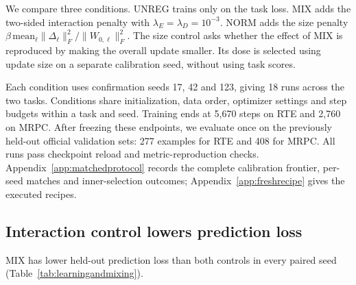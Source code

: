 \documentclass{article}
\begin{document}
We compare three conditions. UNREG trains only on the task loss. MIX adds the two-sided interaction penalty with $\lambda_E=\lambda_D=10^{-3}$. NORM adds the size penalty $\beta\,\mathrm{mean}_\ell\|\Delta_\ell\|_F^2/\|W_{0,\ell}\|_F^2$. The size control asks whether the effect of MIX is reproduced by making the overall update smaller. Its dose is selected using update size on a separate calibration seed, without using task scores.

Each condition uses confirmation seeds 17, 42 and 123, giving 18 runs across the two tasks. Conditions share initialization, data order, optimizer settings and step budgets within a task and seed. Training ends at 5{,}670 steps on RTE and 2{,}760 on MRPC. After freezing these endpoints, we evaluate once on the previously held-out official validation sets: 277 examples for RTE and 408 for MRPC. All runs pass checkpoint reload and metric-reproduction checks. Appendix~\ref{app:matchedprotocol} records the complete calibration frontier, per-seed matches and inner-selection outcomes; Appendix~\ref{app:freshrecipe} gives the executed recipes.

\subsection{Interaction control lowers prediction loss}
MIX has lower held-out prediction loss than both controls in every paired seed (Table~\ref{tab:learningandmixing}).
\end{document}
